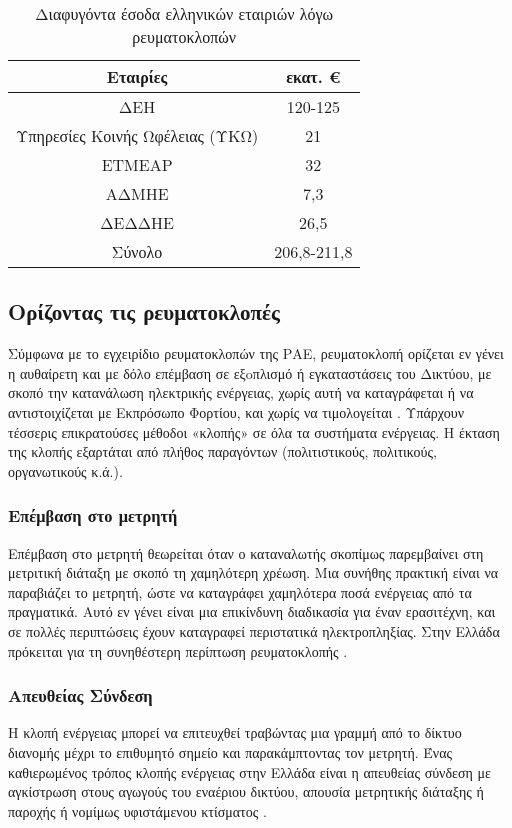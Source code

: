 \begin{table}[ht!]
\centering
\begin{tabular}{ |c||c|  }
 \hline
 Εταιρίες & εκατ. \euro\\
 \hline
 ΔΕΗ & 120-125\\
 Υπηρεσίες Κοινής Ωφέλειας (ΥΚΩ) & 21\\
 ΕΤΜΕΑΡ & 32\\
 ΑΔΜΗΕ & 7,3\\
 ΔΕΔΔΗΕ & 26,5\\
 \hline
 Σύνολο& 206,8-211,8\\
 \hline
\end{tabular}
\caption{Διαφυγόντα έσοδα ελληνικών εταιριών λόγω ρευματοκλοπών}
\label{tab:lostearnings}
\end{table}
\subsection{Ορίζοντας τις ρευματοκλοπές}
Σύμφωνα με το εγχειρίδιο ρευματοκλοπών της ΡΑΕ, ρευματοκλοπή ορίζεται εν γένει η αυθαίρετη και με δόλο επέμβαση σε εξoπλισμό ή εγκαταστάσεις του Δικτύου, με σκοπό την κατανάλωση ηλεκτρικής ενέργειας, χωρίς αυτή να καταγράφεται ή να αντιστοιχίζεται με Εκπρόσωπο Φορτίου, και χωρίς να τιμολογείται \cite{rae}. Υπάρχουν τέσσερις επικρατούσες μέθοδοι «κλοπής» σε όλα τα συστήματα ενέργειας. Η έκταση της κλοπής εξαρτάται από πλήθος παραγόντων (πολιτιστικούς, πολιτικούς, οργανωτικούς κ.ά.). 

\subsubsection{Επέμβαση στο μετρητή}
Επέμβαση στο μετρητή θεωρείται όταν ο καταναλωτής σκοπίμως παρεμβαίνει στη μετριτική διάταξη με σκοπό τη χαμηλότερη χρέωση. Μια συνήθης πρακτική είναι να παραβιάζει το μετρητή, ώστε να καταγράφει χαμηλότερα ποσά ενέργειας από τα πραγματικά. Αυτό εν γένει είναι μια  επικίνδυνη διαδικασία για έναν ερασιτέχνη, και σε πολλές περιπτώσεις έχουν καταγραφεί περιστατικά ηλεκτροπληξίας. Στην Ελλάδα πρόκειται για τη συνηθέστερη περίπτωση ρευματοκλοπής \cite{rae}.
\subsubsection{Απευθείας Σύνδεση}
Η κλοπή ενέργειας μπορεί να επιτευχθεί τραβώντας μια γραμμή από το δίκτυο διανομής μέχρι το επιθυμητό σημείο και παρακάμπτοντας τον μετρητή. Ένας καθιερωμένος τρόπος κλοπής ενέργειας στην Ελλάδα είναι η απευθείας σύνδεση με αγκίστρωση στους αγωγούς του εναέριου δικτύου, απουσία μετρητικής διάταξης ή παροχής ή νομίμως υφιστάμενου κτίσματος \cite{rae}.
